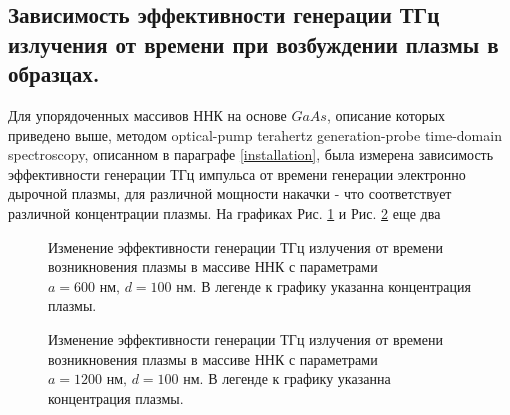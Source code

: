 \documentclass[a4paper,14pt,russian]{extreport}
\begin{document}
			\subsection{Зависимость эффективности генерации ТГц излучения от времени при возбуждении плазмы в образцах.}
				Для упорядоченных массивов ННК на основе $GaAs$, описание которых приведено выше, методом optical-pump terahertz generation-probe time-domain\\ spectroscopy, описанном в параграфе \ref{installation}, была измерена зависимость эффективности генерации ТГц импульса от времени генерации электронно дырочной плазмы, для различной мощности накачки - что соответствует различной концентрации плазмы. На графиках Рис. \ref{ris:long600100} и Рис. \ref{ris:long1200100} еще два
				\begin{figure}[h]
					\caption{Изменение эффективности генерации ТГц излучения от времени возникновения плазмы в массиве ННК с параметрами $a = 600 \text{ нм, } d = 100 \text{ нм}$. В легенде к графику указанна концентрация плазмы.}
				\label{ris:long600100}
				\end{figure}
				\begin{figure}[h]
					\caption{Изменение эффективности генерации ТГц излучения от времени возникновения плазмы в массиве ННК с параметрами $a = 1200 \text{ нм, } d = 100 \text{ нм}$. В легенде к графику указанна концентрация плазмы.}
				\label{ris:long1200100}
				\end{figure}
\end{document}
